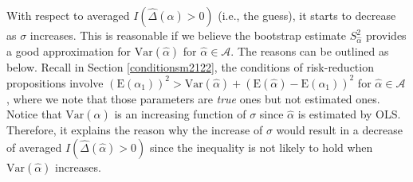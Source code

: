 \documentclass[11pt]{article}
\def\mc#1{\mathcal{#1}} %
\def\E#1{\mathrm{E}(#1)} %
\def\var#1{\mathrm{Var}(#1)} %
\theoremstyle{definition}
\begin{document}
With respect to averaged $I(\hat{\Delta}(\hat{\alpha})>0)$ (i.e., the guess), it starts to decrease as $\sigma$ increases. This is reasonable if we believe the bootstrap estimate $S^2_{\hat{\alpha}}$ provides a good approximation for $\var{\hat{\alpha}}$ for $\hat{\alpha}\in \mc{A}$. The reasons can be outlined as below. Recall in Section \ref{conditionsm2122}, the conditions of risk-reduction propositions involve $(\E{\alpha_1})^2 > \var{\hat{\alpha}} + (\E{\hat{\alpha}}-\E{\alpha_1})^2$ for $\hat{\alpha}\in \mc{A}$, where we note that those parameters are \emph{true} ones but not estimated ones. Notice that $\var{\hat{\alpha}}$ is  an increasing function of $\sigma$ since $\hat{\alpha}$ is estimated by OLS. Therefore, it explains the reason why the increase of $\sigma$ would result in a decrease of averaged $I(\hat{\Delta}(\hat{\alpha})>0)$ since the inequality is not likely to hold when  $\var{\hat{\alpha}}$ increases.
\end{document}

